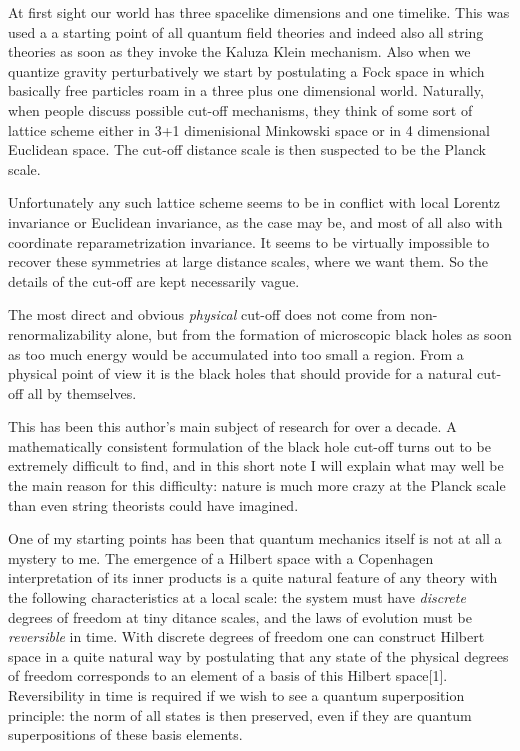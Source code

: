 At first sight our world has three spacelike dimensions and one
timelike. This was used a a starting point of all quantum field
theories and indeed also all string theories as soon as they invoke the
Kaluza Klein mechanism. Also when we quantize gravity perturbatively we
start by postulating a Fock space in which basically free particles
roam in a three plus one dimensional world.  Naturally, when people
discuss possible cut-off mechanisms, they think of some sort of lattice
scheme either in 3+1 dimenisional Minkowski space or in 4 dimensional
Euclidean space. The cut-off distance scale is then suspected to be the
Planck scale.


Unfortunately any such lattice scheme seems to be in conflict with
local Lorentz invariance or Euclidean invariance, as the case may be,
and most of all also with coordinate reparametrization invariance. It
seems to be virtually impossible to recover these symmetries at large
distance scales, where we want them. So the details of the cut-off are
kept necessarily vague.


The most direct and obvious {\it physical} cut-off does not come from
non-renormalizability alone, but from the formation of microscopic
black holes as soon as too much energy would be accumulated into too
small a region. From a physical point of view it is the black holes
that should provide for a natural cut-off all by themselves.

This has been this author's main subject of research for over a decade.
A mathematically consistent formulation of the black hole cut-off turns
out to be extremely difficult to find, and in this short note I will
explain what may well be the main reason for this difficulty: nature is
much more crazy at the Planck scale than even string theorists could
have imagined.

One of my starting points has been that quantum mechanics itself is not
at all a mystery to me. The emergence of a Hilbert space with a
Copenhagen interpretation of its inner products is a quite natural
feature of any theory with the following characteristics at a local
scale: the system must have {\it discrete} degrees of freedom at tiny
ditance scales, and the laws of evolution must be {\it reversible} in
time. With discrete degrees of freedom one can construct Hilbert space
in a quite natural way by postulating that any state of the physical
degrees of freedom corresponds to an element of a basis of this Hilbert
space[1]. Reversibility in time is required if we wish to see a quantum
superposition principle: the norm of all states is then preserved, even
if they are quantum superpositions of these basis elements.

